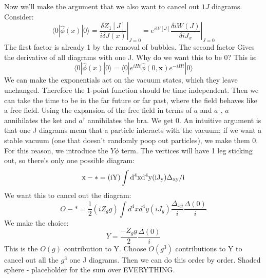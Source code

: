 \documentclass[12 pt]{article}
\begin{document}
\\
\\
Now we'll make the argument that we also want to cancel out $1 J$ diagrams. Consider:
\[  \langle 0| \hat \phi(x) |0\rangle = \left. \frac{\delta Z_1[J]}{i\delta J(x)}\right|_{J=0} = e^{iW[J]} \left. \frac{\delta iW(J)}{\delta i J_x} \right|_{J=0}  \]
The first factor is already 1 by the removal of bubbles. The second factor Gives the derivative of all diagrams with one J. Why do we want this to be 0? This is:
\[   \langle 0| \hat \phi(x) |0\rangle = \langle 0| e^{iHt} \hat \phi(0, \mathbf{x}) e^{-iHt} |0\rangle  \]
We can make the exponentials act on the vacuum states, which they leave unchanged. Therefore the 1-point function should be time independent. Then we can take the time to be in the far future or far past, where the field behaves like a free field. Using the expansion of the free field in terms of $a$ and $a^{\dagger}$, $a$ annihilates the ket and $a^{\dagger}$ annihilates the bra. We get 0. An intuitive argument is that one J diagrams mean that a particle interacts with the vacuum; if we want a stable vacuum  (one that doesn't randomly poop out particles), we make them 0. For this reason, we introduce the $Y\phi$ term. The vertices will have 1 leg sticking out, so there's only one possible diagram:
\[   \rm{x}-* = (iY) \int d^4x d^4y (iJ_y) \Delta_{xy}/i   \]
We want this to cancel out the diagram:
\[  O-*  = \frac{1}{2} (iZ_g g) \int d^4x d^4 y (iJ_y) \frac{\Delta_{xy}}{i} \frac{\Delta(0)}{i}    \]
We make the choice:
\[   Y = \frac{-Z_g g}{2} \frac{\Delta(0)}{i}  \]
This is the $O(g)$ contribution to Y. Choose $O(g^3)$ contributions to Y to cancel out all the $g^3$ one J diagrams. Then we can do this order by order. Shaded sphere - placeholder for the sum over EVERYTHING. 
\end{document}
